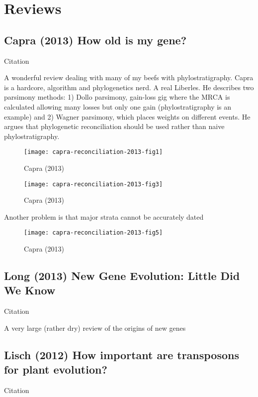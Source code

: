 \section{Reviews}
\subsection{Capra (2013) How old is my gene?}
    Citation \cite{capra_how_2013}

    A wonderful review dealing with many of my beefs with phylostratigraphy.
    Capra is a hardcore, algorithm and phylogenetics nerd. A real Liberles. He
    describes two parsimony methods: 1) Dollo parsimony, gain-loss gig where
    the MRCA is calculated allowing many losses but only one gain
    (phylostratigraphy is an example) and 2) Wagner parsimony, which places
    weights on different events. He argues that phylogenetic reconciliation
    should be used rather than naive phylostratigraphy.

    \begin{figure}[h!]
        \centering
        \texttt{[image: capra-reconciliation-2013-fig1]}
        \caption{Capra (2013) \cite{capra_how_2013}}
    \end{figure}
    \FloatBarrier

    \begin{figure}[h!]
        \centering
        \texttt{[image: capra-reconciliation-2013-fig3]}
        \caption{Capra (2013) \cite{capra_how_2013}}
    \end{figure}
    \FloatBarrier

    Another problem is that major strata cannot be accurately dated

    \begin{figure}[h!]
        \centering
        \texttt{[image: capra-reconciliation-2013-fig5]}
        \caption{Capra (2013) \cite{capra_how_2013}}
    \end{figure}
    \FloatBarrier

\subsection{Long (2013) New Gene Evolution: Little Did We Know}
    Citation \cite{long_new_2013}

    A very large (rather dry) review of the origins of new genes

\subsection{Lisch (2012) How important are transposons for plant evolution?}
    Citation \cite{lisch_how_2012}
    

